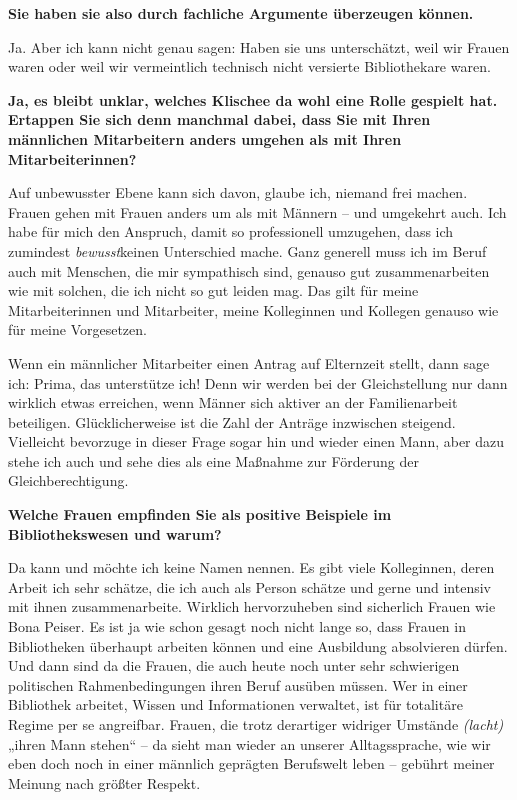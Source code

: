 \documentclass[a4paper,
fontsize=11pt,
oneside,
numbers=noperiodatend,
parskip=half-,
bibliography=totoc,
final
]{scrartcl}
\begin{document}
\textbf{Sie haben sie also durch fachliche Argumente überzeugen
können.~}

Ja. Aber ich kann nicht genau sagen: Haben sie uns unterschätzt, weil
wir Frauen waren oder weil wir vermeintlich technisch nicht versierte
Bibliothekare waren.

\textbf{Ja, es bleibt unklar, welches Klischee da wohl eine Rolle
gespielt hat. Ertappen Sie sich denn manchmal dabei, dass Sie mit Ihren
männlichen Mitarbeitern anders umgehen als mit Ihren Mitarbeiterinnen?~}

Auf unbewusster Ebene kann sich davon, glaube ich, niemand frei machen.
Frauen gehen mit Frauen anders um als mit Männern -- und umgekehrt auch.
Ich habe für mich den Anspruch, damit so professionell umzugehen, dass
ich zumindest \emph{bewusst}keinen Unterschied mache. Ganz generell muss
ich im Beruf auch mit Menschen, die mir sympathisch sind, genauso gut
zusammenarbeiten wie mit solchen, die ich nicht so gut leiden mag. Das
gilt für meine Mitarbeiterinnen und Mitarbeiter, meine Kolleginnen und
Kollegen genauso wie für meine Vorgesetzen.~

Wenn ein männlicher Mitarbeiter einen Antrag auf Elternzeit stellt, dann
sage ich: Prima, das unterstütze ich! Denn wir werden bei der
Gleichstellung nur dann wirklich etwas erreichen, wenn Männer sich
aktiver an der Familienarbeit beteiligen. Glücklicherweise ist die Zahl
der Anträge inzwischen steigend. Vielleicht bevorzuge in dieser Frage
sogar hin und wieder einen Mann, aber dazu stehe ich auch und sehe dies
als eine Maßnahme zur Förderung der Gleichberechtigung.

\textbf{Welche Frauen empfinden Sie als positive Beispiele im
Bibliothekswesen und warum?}

Da kann und möchte ich keine Namen nennen. Es gibt viele Kolleginnen,
deren Arbeit ich sehr schätze, die ich auch als Person schätze und gerne
und intensiv mit ihnen zusammenarbeite. Wirklich hervorzuheben sind
sicherlich Frauen wie Bona Peiser. Es ist ja wie schon gesagt noch nicht
lange so, dass Frauen in Bibliotheken überhaupt arbeiten können und eine
Ausbildung absolvieren dürfen. Und dann sind da die Frauen, die auch
heute noch unter sehr schwierigen politischen Rahmenbedingungen ihren
Beruf ausüben müssen. Wer in einer Bibliothek arbeitet, Wissen und
Informationen verwaltet, ist für totalitäre Regime per se angreifbar.
Frauen, die trotz derartiger widriger Umstände \emph{(lacht)} „ihren
Mann stehen`` -- da sieht man wieder an unserer Alltagssprache, wie wir
eben doch noch in einer männlich geprägten Berufswelt leben -- gebührt
meiner Meinung nach größter Respekt.~
\end{document}
